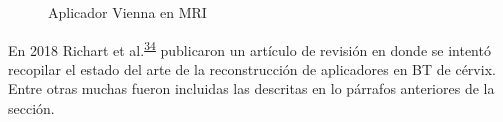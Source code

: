 \documentclass[
  a4paper,
]{scrreprt}
\begin{document}
\begin{figure}

\begin{minipage}[t]{\linewidth}

{\centering 


}

\end{minipage}%
\newline
\begin{minipage}[t]{\linewidth}

{\centering 


}

\end{minipage}%

\caption{\label{fig-viena}Aplicador Vienna en MRI}

\end{figure}

En 2018 Richart et
al.\textsuperscript{\protect\hyperlink{ref-richart2018}{34}} publicaron
un artículo de revisión en donde se intentó recopilar el estado del arte
de la reconstrucción de aplicadores en BT de cérvix. Entre otras muchas
fueron incluidas las descritas en lo párrafos anteriores de la sección.
\end{document}
